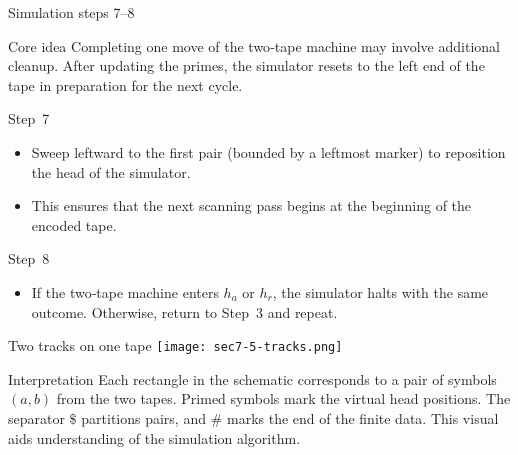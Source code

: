 \begin{frame}[t]{Simulation steps 7–8}
  \begin{tblock}{Core idea}
    Completing one move of the two‑tape machine may involve additional
    cleanup.  After updating the primes, the simulator resets to the
    left end of the tape in preparation for the next cycle.
  \end{tblock}
  \begin{tblock}{Step 7}
    \begin{itemize}
      \item Sweep leftward to the first pair (bounded by a leftmost
        marker) to reposition the head of the simulator.
      \item This ensures that the next scanning pass begins at the
        beginning of the encoded tape.
    \end{itemize}
  \end{tblock}
  \begin{tblock}{Step 8}
    \begin{itemize}
      \item If the two‑tape machine enters $h_a$ or $h_r$, the simulator
        halts with the same outcome.  Otherwise, return to Step 3 and
        repeat.
    \end{itemize}
  \end{tblock}
  \label{fr:7.5-08}
\end{frame}

\begin{frame}[t]{Two tracks on one tape}
  \centering
  \texttt{[image: sec7-5-tracks.png]} %
  \begin{tblock}{Interpretation}
    Each rectangle in the schematic corresponds to a pair of symbols
    $(a,b)$ from the two tapes.  Primed symbols mark the virtual head
    positions.  The separator $\$$ partitions pairs, and $\#$ marks the
    end of the finite data.  This visual aids understanding of the
    simulation algorithm.
  \end{tblock}
  \label{fr:7.5-09}
\end{frame}

